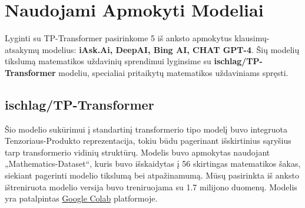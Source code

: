 \documentclass[conference]{IEEEtran}
\begin{document}









\section{Naudojami Apmokyti Modeliai}
Lyginti su TP-Transformer pasirinkome 5 iš anksto apmokytus klausimų-atsakymų modelius: \textbf{
iAsk.Ai, DeepAI, Bing AI, CHAT GPT-4}. Šių modelių tikslumą matematikos uždavinių sprendimui lyginsime su \textbf{ischlag/TP-Transformer} modeliu,
specialiai pritaikytų matematikos uždaviniams spręsti.

\subsection{ischlag/TP-Transformer}
Šio modelio sukūrimui į standartinį transformerio tipo modelį buvo integruota Tenzoriaus-Produkto
reprezentacija, tokiu būdu pagerinant išskirtinius sąryšius tarp transformerio vidinių struktūrų. \cite{tptransformer} Modelis buvo apmokytas
naudojant „Mathematics-Dataset“, kuris buvo išskaidytas į 56 skirtingas matematikos šakas, siekiant
pagerinti modelio tikslumą bei atpažinamumą. Mūsų pasirinkta iš anksto ištreniruota modelio 
versija buvo treniruojama su 1.7 milijono duomenų. Modelis yra patalpintas 
\href{https://colab.research.google.com/drive/1Zi9FOwcO_i-4FDQQGgMMfcZxZISpJNMT}{Google Colab} platformoje.
\end{document}
